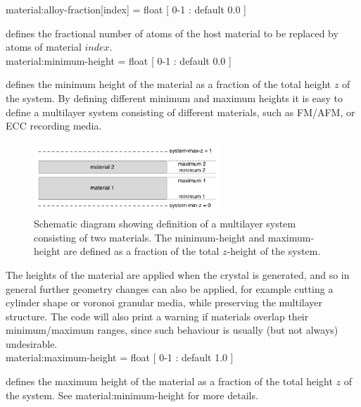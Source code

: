
{\zicf material:alloy-fraction[index] = float [ 0-1 : default 0.0 ]} defines the fractional number of atoms of the host material to be replaced by atoms of material $index$.\\

{\zicf material:minimum-height = float [ 0-1 : default 0.0 ]} defines the minimum height of the material as a fraction of the total height $z$ of the system. By defining different minimum and maximum heights it is easy to define a multilayer system consisting of different materials, such as FM/AFM, or ECC recording media. 

\begin{figure}[!h]
\center
\includegraphics[width=7cm]{figures/multilayers.pdf}
\caption{Schematic diagram showing definition of a multilayer system consisting of two materials. The minimum-height and maximum-height are defined as a fraction of the total $z$-height of the system.} 
\label{fig:multilayer}
\end{figure}

The heights of the material are applied when the crystal is generated, and so in general further geometry changes can also be applied, for example cutting a cylinder shape or voronoi granular media, while preserving the multilayer structure. The code will also print a warning if materials overlap their minimum/maximum ranges, since such behaviour is usually (but not always) undesirable.\\

{\zicf material:maximum-height = float [ 0-1 : default 1.0 ]} defines the maximum height of the material as a fraction of the total height $z$ of the system. See material:minimum-height for more details.\\

